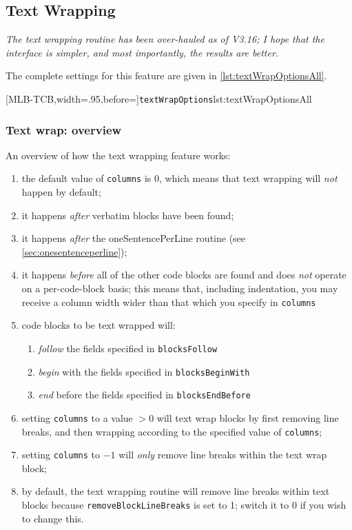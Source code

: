 \subsection{Text Wrapping}\label{subsec:textwrapping}
 \emph{The text wrapping routine has been over-hauled as
 of V3.16; I hope that the interface is simpler, and most importantly, the results are
 better}.

 The complete settings for this feature are given in \cref{lst:textWrapOptionsAll}.

 [MLB-TCB,width=.95\linewidth,before=\centering]{\texttt{textWrapOptions}}{lst:textWrapOptionsAll}

\subsubsection{Text wrap: overview}
 An overview of how the text wrapping feature works:
 \begin{enumerate}
  \item the default value of \texttt{columns} is 0, which means that text wrapping will
        \emph{not} happen by default;
  \item it happens \emph{after} verbatim blocks have been found;
  \item it happens \emph{after} the oneSentencePerLine routine (see
        \cref{sec:onesentenceperline});
  \item it happens \emph{before} all of the other code blocks are found and does \emph{not}
        operate on a per-code-block basis; this means that, including indentation, you may
        receive a column width wider than that which you specify in \texttt{columns}
  \item code blocks to be text wrapped will:
        \begin{enumerate}
         \item \emph{follow} the fields specified in \texttt{blocksFollow}
         \item \emph{begin} with the fields specified in \texttt{blocksBeginWith}
         \item \emph{end} before the fields specified in \texttt{blocksEndBefore}
        \end{enumerate}
  \item setting \texttt{columns} to a value $>0$ will text wrap blocks by first removing line
        breaks, and then wrapping according to the specified value of \texttt{columns};
  \item setting \texttt{columns} to $-1$ will \emph{only} remove line breaks within the text wrap
        block;
  \item by default, the text wrapping routine will remove line breaks within text blocks because
        \texttt{removeBlockLineBreaks} is set to 1; switch it to 0 if you wish to change this.
 \end{enumerate}

